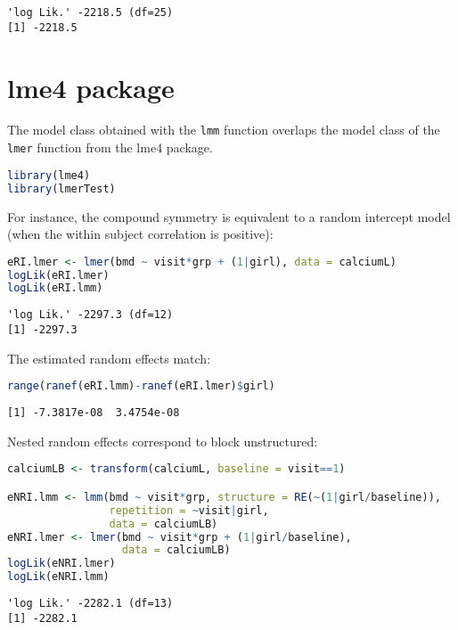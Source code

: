 \documentclass[12pt]{article}
\begin{document}
\label{}
\begin{verbatim}
'log Lik.' -2218.5 (df=25)
[1] -2218.5
\end{verbatim}


\clearpage
\section{lme4 package}
\label{sec:org7c59d47}

The model class obtained with the \texttt{lmm} function overlaps the model
class of the \texttt{lmer} function from the lme4 package.
\begin{lstlisting}[language=r,numbers=none]
library(lme4)
library(lmerTest)
\end{lstlisting}

For instance, the compound symmetry is equivalent to a random
intercept model (when the within subject correlation is positive):
\begin{lstlisting}[language=r,numbers=none]
eRI.lmer <- lmer(bmd ~ visit*grp + (1|girl), data = calciumL)
logLik(eRI.lmer)
logLik(eRI.lmm)
\end{lstlisting}

\label{}
\begin{verbatim}
'log Lik.' -2297.3 (df=12)
[1] -2297.3
\end{verbatim}


The estimated random effects match:
\begin{lstlisting}[language=r,numbers=none]
range(ranef(eRI.lmm)-ranef(eRI.lmer)$girl)
\end{lstlisting}

\label{}
\begin{verbatim}
[1] -7.3817e-08  3.4754e-08
\end{verbatim}


Nested random effects correspond to block unstructured:
\begin{lstlisting}[language=r,numbers=none]
calciumLB <- transform(calciumL, baseline = visit==1)

eNRI.lmm <- lmm(bmd ~ visit*grp, structure = RE(~(1|girl/baseline)),
                repetition = ~visit|girl,
                data = calciumLB)
eNRI.lmer <- lmer(bmd ~ visit*grp + (1|girl/baseline),
                  data = calciumLB)
logLik(eNRI.lmer)
logLik(eNRI.lmm)
\end{lstlisting}

\label{}
\begin{verbatim}
'log Lik.' -2282.1 (df=13)
[1] -2282.1
\end{verbatim}
\end{document}
